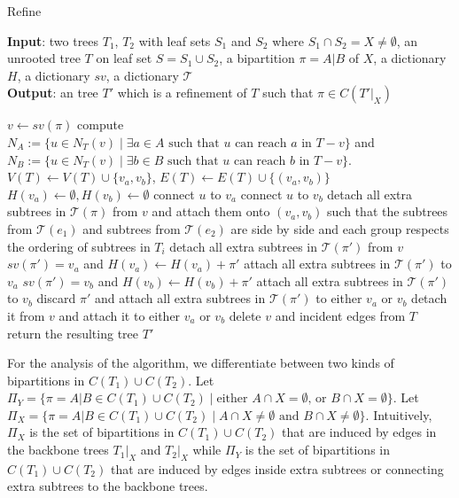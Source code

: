 \documentclass{bmcart}
\begin{document}
\begin{algorithm}
    \caption{Refine}
    \label{alg:refine}
    \textbf{Input}: two trees $T_1$, $T_2$ with leaf sets $S_1$ and $S_2$ where $S_1 \cap S_2 = X \neq \emptyset$, an unrooted tree $T$ on leaf set $S = S_1 \cup S_2$, a bipartition $\pi = A|B$ of $X$, a dictionary $H$, a dictionary $sv$, a dictionary $\mathcal{T}$\\
    \textbf{Output}: an tree $T'$ which is a refinement of $T$ such that $\pi \in C(T'|_X)$ 
    \begin{algorithmic}[1]
        \State $v \gets sv(\pi)$
        \State compute $N_A:= \{u \in N_T(v) \mid \text{$\exists a \in A$ such that $u$ can reach $a$ in $T-v$}\}$ and $N_B:= \{u \in N_T(v) \mid \text{$\exists b \in B$ such that $u$ can reach $b$ in $T-v$}\}$.
        \State $V(T) \gets V(T) \cup \{v_a, v_b\}$, $E(T) \gets E(T) \cup \{(v_a,v_b)\}$
        \State $H(v_a) \gets \emptyset, H(v_b) \gets \emptyset$
             connect $u$ to $v_a$
            \Else{} connect $u$ to $v_b$
            \EndIf
        \EndFor
        \State detach all extra subtrees in $\mathcal{T}(\pi)$ from $v$ and attach them onto $(v_a,v_b)$ such that the subtrees from $\mathcal{T}(e_1)$ and subtrees from $\mathcal{T}(e_2)$ are side by side and each group respects the ordering of subtrees in $T_i$
            \State detach all extra subtrees in $\mathcal{T}(\pi')$ from $v$ 
                \State $sv(\pi') = v_a$ and $H(v_a) \gets H(v_a) + \pi'$
                \State attach all extra subtrees in $\mathcal{T}(\pi')$ to $v_a$
                \State $sv(\pi') = v_b$ and $H(v_b) \gets H(v_b) + \pi'$
                \State attach all extra subtrees in $\mathcal{T}(\pi')$ to $v_b$
            \Else{} 
                \State discard $\pi'$ and attach all extra subtrees in $\mathcal{T}(\pi')$ to either $v_a$ or $v_b$ 
            \EndIf
        \EndFor
            \State detach it from $v$ and attach it to either $v_a$ or $v_b$
        \EndFor
        \State delete $v$ and incident edges from $T$
        \State return the resulting tree $T'$
    \end{algorithmic}
\end{algorithm}

For the analysis of the algorithm, we differentiate between two kinds of bipartitions in $C(T_1) \cup C(T_2)$. Let $\Pi_Y = \{\pi = A|B \in C(T_1) \cup C(T_2) \mid \text{either } A\cap X = \emptyset \text{, or } B \cap X = \emptyset\}$. Let $\Pi_X = \{\pi = A|B \in C(T_1) \cup C(T_2) \mid A\cap X \neq \emptyset \text{ and } B\cap X \neq \emptyset \}$. Intuitively, $\Pi_X$ is the set of bipartitions in $C(T_1)\cup C(T_2)$ that are induced by edges in the backbone trees $T_1|_X$ and $T_2|_X$ while $\Pi_Y$ is the set of bipartitions in $C(T_1)\cup C(T_2)$ that are induced by edges inside extra subtrees or connecting extra subtrees to the backbone trees.\\
\end{document}
